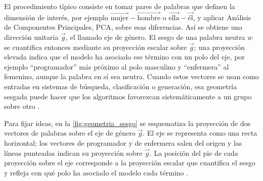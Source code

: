 \documentclass[12pt,a4paper]{report}
\begin{document}
El procedimiento típico consiste en tomar pares de palabras que definen la dimensión de interés, por ejemplo $\vec{\text{mujer}} - \vec{\text{hombre}}$ o $\vec{\text{ella}} - \vec{\text{él}}$, y aplicar Análisis de Componentes Principales, PCA, sobre esas diferencias. Así se obtiene una dirección unitaria $\vec{g}$, el llamado eje de género. El sesgo de una palabra neutra $w$ se cuantifica entonces mediante su proyección escalar sobre $\vec{g}$; una proyección elevada indica que el modelo ha asociado ese término con un polo del eje, por ejemplo ``programador'' más próximo al polo masculino y ``enfermera'' al femenino, aunque la palabra en sí sea neutra. Cuando estos vectores se usan como entradas en sistemas de búsqueda, clasificación o generación, esa geometría sesgada puede hacer que los algoritmos favorezcan sistemáticamente a un grupo sobre otro \cite{bolukbasi_man_2016}.

Para fijar ideas, en la \autoref{fig:geometria_sesgo} se esquematiza la proyección de dos vectores de palabras sobre el eje de género $\vec{g}$. El eje se representa como una recta horizontal; los vectores de programador y de enfermera salen del origen y las líneas punteadas indican su proyección sobre $\vec{g}$. La posición del pie de cada proyección sobre el eje corresponde a la proyección escalar que cuantifica el sesgo y refleja con qué polo ha asociado el modelo cada término \cite{bolukbasi_man_2016}.
\end{document}
